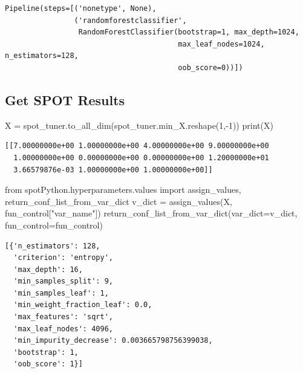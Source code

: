 \documentclass[
  letterpaper,
  DIV=11,
  numbers=noendperiod]{scrreprt}
\newenvironment{Shaded}{\begin{snugshade}}{\end{snugshade}}
\newcommand{\BuiltInTok}[1]{\textcolor[rgb]{0.00,0.23,0.31}{#1}}
\newcommand{\DecValTok}[1]{\textcolor[rgb]{0.68,0.00,0.00}{#1}}
\newcommand{\ImportTok}[1]{\textcolor[rgb]{0.00,0.46,0.62}{#1}}
\newcommand{\NormalTok}[1]{\textcolor[rgb]{0.00,0.23,0.31}{#1}}
\newcommand{\OperatorTok}[1]{\textcolor[rgb]{0.37,0.37,0.37}{#1}}
\newcommand{\StringTok}[1]{\textcolor[rgb]{0.13,0.47,0.30}{#1}}
\begin{document}
\begin{verbatim}
Pipeline(steps=[('nonetype', None),
                ('randomforestclassifier',
                 RandomForestClassifier(bootstrap=1, max_depth=1024,
                                        max_leaf_nodes=1024, n_estimators=128,
                                        oob_score=0))])
\end{verbatim}

\hypertarget{get-spot-results-1}{%
\subsection{Get SPOT Results}\label{get-spot-results-1}}

\begin{Shaded}
\begin{Highlighting}[]
\NormalTok{X }\OperatorTok{=}\NormalTok{ spot\_tuner.to\_all\_dim(spot\_tuner.min\_X.reshape(}\DecValTok{1}\NormalTok{,}\OperatorTok{{-}}\DecValTok{1}\NormalTok{))}
\BuiltInTok{print}\NormalTok{(X)}
\end{Highlighting}
\end{Shaded}

\begin{verbatim}
[[7.00000000e+00 1.00000000e+00 4.00000000e+00 9.00000000e+00
  1.00000000e+00 0.00000000e+00 0.00000000e+00 1.20000000e+01
  3.66579876e-03 1.00000000e+00 1.00000000e+00]]
\end{verbatim}

\begin{Shaded}
\begin{Highlighting}[]
\ImportTok{from}\NormalTok{ spotPython.hyperparameters.values }\ImportTok{import}\NormalTok{ assign\_values, return\_conf\_list\_from\_var\_dict}
\NormalTok{v\_dict }\OperatorTok{=}\NormalTok{ assign\_values(X, fun\_control[}\StringTok{"var\_name"}\NormalTok{])}
\NormalTok{return\_conf\_list\_from\_var\_dict(var\_dict}\OperatorTok{=}\NormalTok{v\_dict, fun\_control}\OperatorTok{=}\NormalTok{fun\_control)}
\end{Highlighting}
\end{Shaded}

\begin{verbatim}
[{'n_estimators': 128,
  'criterion': 'entropy',
  'max_depth': 16,
  'min_samples_split': 9,
  'min_samples_leaf': 1,
  'min_weight_fraction_leaf': 0.0,
  'max_features': 'sqrt',
  'max_leaf_nodes': 4096,
  'min_impurity_decrease': 0.003665798756399038,
  'bootstrap': 1,
  'oob_score': 1}]
\end{verbatim}
\end{document}
